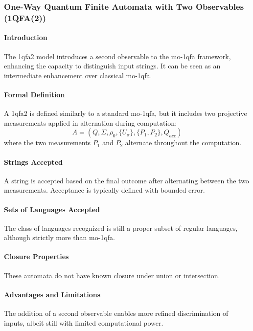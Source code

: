 \subsubsection{One-Way Quantum Finite Automata with Two Observables (1QFA(2))}
\paragraph{Introduction}
The \gls{1qfa2} model introduces a second observable to the \gls{mo-1qfa} framework, enhancing the capacity to distinguish input strings. It can be seen as an intermediate enhancement over classical \gls{mo-1qfa}.

\paragraph{Formal Definition}
A \gls{1qfa2} is defined similarly to a standard \gls{mo-1qfa}, but it includes two projective measurements applied in alternation during computation:
\[
A = (Q, \Sigma, \rho_0, \{U_{\sigma}\}, \{P_1, P_2\}, Q_{acc})
\]
where the two measurements \( P_1 \) and \( P_2 \) alternate throughout the computation.

\paragraph{Strings Accepted}
A string is accepted based on the final outcome after alternating between the two measurements. Acceptance is typically defined with bounded error.

\paragraph{Sets of Languages Accepted}
The class of languages recognized is still a proper subset of regular languages, although strictly more than \gls{mo-1qfa}.

\paragraph{Closure Properties}
These automata do not have known closure under union or intersection.

\paragraph{Advantages and Limitations}
The addition of a second observable enables more refined discrimination of inputs, albeit still with limited computational power.

